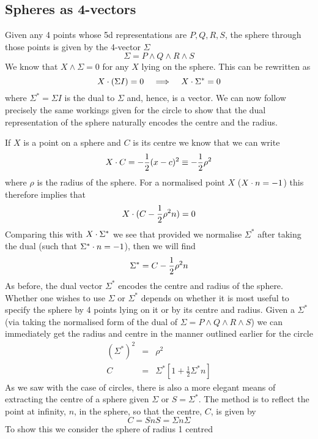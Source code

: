 \subsection{Spheres as 4-vectors}

Given any 4 points whose 5d representations are
$P,Q,R,S$, the sphere through those points is given by
the 4-vector $\Sigma$
%
\[  \Sigma = P\wedge Q \wedge R\wedge S   \]
%
We know that $X \wedge \Sigma = 0 $ for any $X$ lying on
the sphere.  This can be rewritten as
%
\[ X \cdot (\Sigma I) =0  \;\;\; \implies \;\;\; X\cdot \Sigma^{*} = 0  \]
%
where $\Sigma^{*}= \Sigma I$ is the dual to
$\Sigma$ and, hence, is a vector. We can now follow precisely the
same workings given for the circle to show that the dual
representation of the sphere naturally encodes the centre
and the radius.

If $X$ is a point on a sphere and $C$ is its centre we
know that we can write
%
\[  X\cdot C = -\frac{1}{2}(x-c)^2 \equiv -\frac{1}{2}\rho^2  \]
%
where $\rho$ is the radius of the sphere. For a
normalised point $X$ ($X\cdot n = -1$) this therefore
implies that
%
\[ X\cdot (C - \frac{1}{2}\rho^2n) =0 \]
%
Comparing this with $X\cdot \Sigma^*$ we see that provided
we normalise $\Sigma^*$ after taking the dual (such that
$\Sigma^*\cdot n = -1$), then we will find
%
\begin{equation}
   \Sigma^* = C - \frac{1}{2}\rho^2 n
   \end{equation}
%
As before, the dual  vector $\Sigma^*$ encodes the
centre and radius of the sphere. Whether one wishes to
use $\Sigma$ or $\Sigma^*$ depends on whether it is most
useful to specify the sphere by 4 points lying on it or
by its centre and radius. Given a $\Sigma^*$ (via taking
the normalised form of the dual of $\Sigma = P\wedge Q\wedge
R\wedge S $) we can immediately get the radius and centre
in the manner outlined earlier for the circle
%
\begin{eqnarray}
    \left(\Sigma^*\right)^2 &  = &      \rho^2 \\
    C & = &  \Sigma^* \left[ 1 + \frac{1}{2}\Sigma^*n \right]
 \end{eqnarray}
 \label{centre_radius}
As we saw with the case of circles, there is also a more
elegant means of extracting the centre of a sphere given
$\Sigma$ or $S = \Sigma^*$. The method is to reflect the
point at infinity, $n$, in the sphere, so that the
centre, $C$, is given by
%
\begin{equation}
  C = SnS = \Sigma n \Sigma
  \end{equation}
%
To show this we consider the sphere of radius 1 centred
